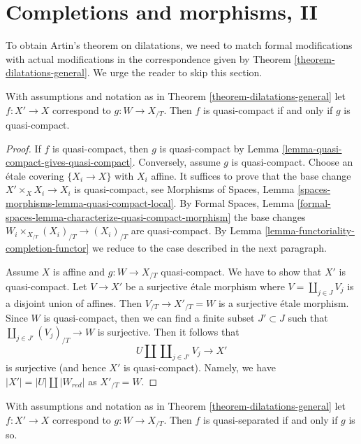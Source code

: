 \section{Completions and morphisms, II}
\label{section-completion-and-morphisms-bis}

\noindent
To obtain Artin's theorem on dilatations, we need to match
formal modifications with actual modifications in the correspondence
given by Theorem \ref{theorem-dilatations-general}.
We urge the reader to skip this section.

\begin{lemma}
\label{lemma-output-quasi-compact}
With assumptions and notation as in Theorem \ref{theorem-dilatations-general}
let $f : X' \to X$ correspond to $g : W \to X_{/T}$.
Then $f$ is quasi-compact if and only if $g$ is quasi-compact.
\end{lemma}

\begin{proof}
If $f$ is quasi-compact, then $g$ is quasi-compact by
Lemma \ref{lemma-quasi-compact-gives-quasi-compact}.
Conversely, assume $g$ is quasi-compact.
Choose an \'etale covering $\{X_i \to X\}$ with $X_i$ affine.
It suffices to prove that the base change $X' \times_X X_i \to X_i$
is quasi-compact, see
Morphisms of Spaces, Lemma \ref{spaces-morphisms-lemma-quasi-compact-local}.
By Formal Spaces, Lemma
\ref{formal-spaces-lemma-characterize-quasi-compact-morphism}
the base changes $W_i \times_{X_{/T}} (X_i)_{/T}  \to (X_i)_{/T}$
are quasi-compact.
By Lemma \ref{lemma-functoriality-completion-functor}
we reduce to the case described in the next paragraph.

\medskip\noindent
Assume $X$ is affine and $g : W \to X_{/T}$ quasi-compact.
We have to show that $X'$ is quasi-compact.
Let $V \to X'$ be a surjective \'etale morphism
where $V = \coprod_{j \in J} V_j$ is a disjoint union of affines. Then
$V_{/T} \to X'_{/T} = W$ is a surjective \'etale morphism.
Since $W$ is quasi-compact, then we can find a finite subset
$J' \subset J$ such that $\coprod_{j \in J'} (V_j)_{/T} \to W$ is surjective.
Then it follows that
$$
U \amalg \coprod\nolimits_{j \in J'} V_j \longrightarrow X'
$$
is surjective (and hence $X'$ is quasi-compact).
Namely, we have $|X'| = |U| \amalg |W_{red}|$ as $X'_{/T} = W$.
\end{proof}

\begin{lemma}
\label{lemma-output-quasi-separated}
With assumptions and notation as in Theorem \ref{theorem-dilatations-general}
let $f : X' \to X$ correspond to $g : W \to X_{/T}$.
Then $f$ is quasi-separated if and only if $g$ is so.
\end{lemma}

